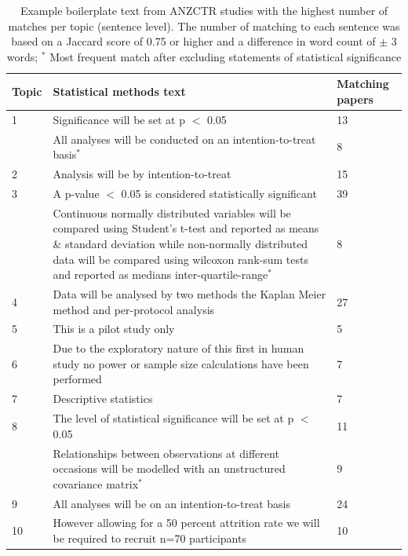 \documentclass[12pt]{article}
\begin{document}
\begin{table}
\caption{\label{tab:anzctr-example-boilerplate} Example boilerplate text from ANZCTR studies with the highest number of matches per topic (sentence level). The number of matching to each sentence was based on a Jaccard score of 0.75 or higher and a difference in word count of $\pm$ 3 words; $^{*}$ Most frequent match after excluding statements of statistical significance}
\centering
\begin{tabular}[t]{p{}p{}p{}}
\hline
Topic & Statistical methods text & Matching papers\\
\hline
1 & Significance will be set at p $<$ 0.05 & 13\\
 &  All analyses will be conducted on an intention-to-treat basis$^{*}$ & 8\\
\hline
2 & Analysis will be by intention-to-treat & 15\\
\hline
3 & A p-value $<$ 0.05 is considered statistically significant & 39\\
 & Continuous normally distributed variables will be compared using Student's t-test and reported as means \& standard deviation while non-normally distributed data will be compared using wilcoxon rank-sum tests and reported as medians inter-quartile-range$^{*}$ & 8\\
\hline
4 & Data will be analysed by two methods the Kaplan Meier method and per-protocol analysis & 27\\
\hline
5 & This is a pilot study only & 5\\
\hline
6 & Due to the exploratory nature of this first in human study no power or sample size calculations have been performed & 7\\
\hline
7 & Descriptive statistics & 7\\
\hline
8 & The level of statistical significance will be set at p $<$ 0.05 & 11\\
& Relationships between observations at different occasions will be modelled with an unstructured covariance matrix$^{*}$ & 9\\
\hline
9 & All analyses will be on an intention-to-treat basis & 24\\
\hline
10 & However allowing for a 50 percent attrition rate we will be required to recruit n=70 participants & 10\\

\hline
\end{tabular}
\end{table}
\end{document}
